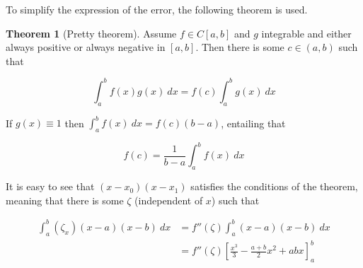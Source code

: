 \documentclass[12pt]{article}
\theoremstyle{definition}
\newtheorem{theorem}{Theorem}
\begin{document}
To simplify the expression of the error, the following theorem is used. 

\begin{theorem}[Pretty theorem]
    Assume $f \in C[a,b]$ and $g$ integrable and either always positive or
    always negative in $[a, b]$. Then there is some $c \in (a, b)$ such that 

    \begin{equation*}
        \int_a^b f(x) g(x)~ dx = f(c) \int_a^b g(x) ~ dx
    \end{equation*}

    If $g(x) \equiv 1$ then $\int_a^b f(x) ~ dx = f(c)(b-a)$, entailing that 

    \begin{equation*}
        f(c) = \frac{1}{b-a}\int_a^b f(x) ~ dx
    \end{equation*}
\end{theorem}

It is easy to see that $(x - x_0)(x-x_1)$ satisfies the conditions of the
theorem, meaning that there is some $\zeta$ (independent of $x$) such that 

\begin{align*}
    \int_a^b (\zeta_x)(x-a)(x-b) ~ dx 
    &= f''(\zeta)\int_a^b(x-a)(x-b) ~ dx\\ 
    &= f''(\zeta)\left[ \frac{x^3}{3} - \frac{a+b}{2} x^2 + abx \right]_a^b
\end{align*}
\end{document}
